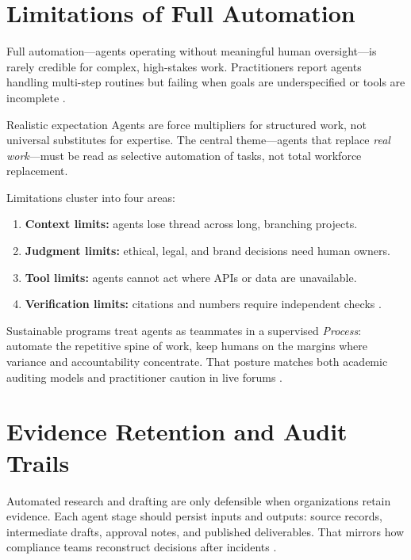 \section{Limitations of Full Automation}
\label{sec:limitations}

Full automation---agents operating without meaningful human oversight---is rarely credible
for complex, high-stakes work. Practitioners report agents handling multi-step routines but
failing when goals are underspecified or tools are incomplete
\cite{redditcomplextasks}.

\begin{warningbox}{Realistic expectation}
Agents are force multipliers for structured work, not universal substitutes for expertise.
The central theme---agents that replace \emph{real work}---must be read as selective
automation of tasks, not total workforce replacement.
\end{warningbox}

Limitations cluster into four areas:
\begin{enumerate}
  \item \textbf{Context limits:} agents lose thread across long, branching projects.
  \item \textbf{Judgment limits:} ethical, legal, and brand decisions need human owners.
  \item \textbf{Tool limits:} agents cannot act where APIs or data are unavailable.
  \item \textbf{Verification limits:} citations and numbers require independent checks
    \cite{arxiv2506workagents}.
\end{enumerate}

Sustainable programs treat agents as teammates in a supervised \emph{Process}: automate
the repetitive spine of work, keep humans on the margins where variance and accountability
concentrate. That posture matches both academic auditing models and practitioner caution in
live forums \cite{redditcomplextasks,mediumworkflowagents}.

\section{Evidence Retention and Audit Trails}
\label{sec:audit-trails}

Automated research and drafting are only defensible when organizations retain evidence.
Each agent stage should persist inputs and outputs: source records, intermediate drafts,
approval notes, and published deliverables. That mirrors how compliance teams reconstruct
decisions after incidents \cite{arxiv2506workagents}.

